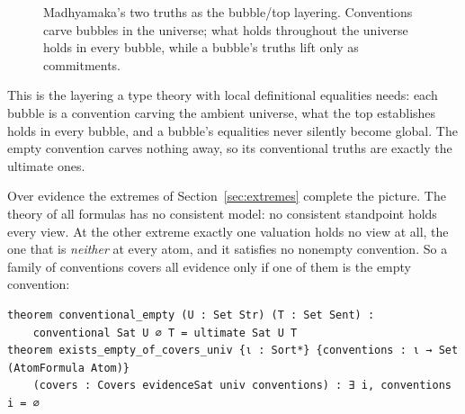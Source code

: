 \documentclass[11pt]{article}
\theoremstyle{plain}
\theoremstyle{definition}
\begin{document}
\begin{figure}[ht]
\centering
{}
\caption{Madhyamaka's two truths as the bubble/top layering. Conventions carve bubbles in the
universe; what holds throughout the universe holds in every bubble, while a bubble's truths
lift only as commitments.}
\label{fig:twotruths}
\end{figure}

\noindent This is the layering a type theory with local definitional equalities needs: each
bubble is a convention carving the ambient universe, what the top establishes holds in every
bubble, and a bubble's equalities never silently become global. The empty convention carves
nothing away, so its conventional truths are exactly the ultimate ones.

Over evidence the extremes of Section~\ref{sec:extremes} complete the picture. The theory of
all formulas has no consistent model: no consistent standpoint holds every view. At the other
extreme exactly one valuation holds no view at all, the one that is \emph{neither} at every
atom, and it satisfies no nonempty convention. So a family of conventions covers all evidence
only if one of them is the empty convention:

\begin{lstlisting}
theorem conventional_empty (U : Set Str) (T : Set Sent) :
    conventional Sat U ∅ T = ultimate Sat U T
theorem exists_empty_of_covers_univ {ι : Sort*} {conventions : ι → Set (AtomFormula Atom)}
    (covers : Covers evidenceSat univ conventions) : ∃ i, conventions i = ∅
\end{lstlisting}
\end{document}
